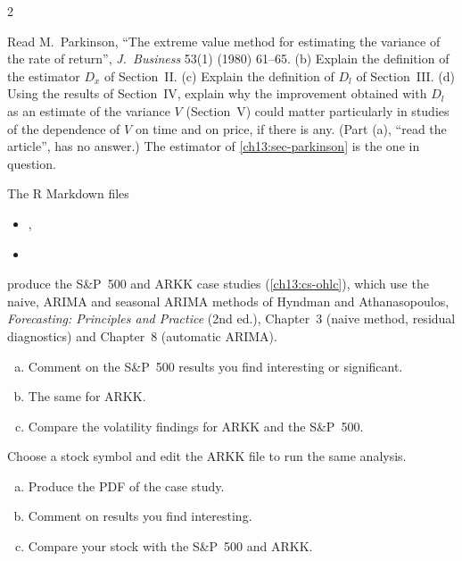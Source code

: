 \begin{paracol}{2}
\begin{exercise}\label{ch13:ex-ps5-p3}
Read M.~Parkinson, ``The extreme value method for estimating the variance of the rate of return'', \emph{J.\ Business} 53(1) (1980) 61--65. (b) Explain the definition of the estimator $D_x$ of Section~II. (c) Explain the definition of $D_l$ of Section~III. (d) Using the results of Section~IV,
explain why the improvement obtained with $D_l$ as an estimate of the variance $V$ (Section~V) could matter particularly in studies of the dependence of $V$ on time and on price, if there is any. (Part (a), ``read the article'', has no answer.) The estimator of \cref{ch13:sec-parkinson} is the one in question.
\end{exercise}

\begin{exercise}\label{ch13:ex-ps5-p4}
The R Markdown files
\begin{itemize}\item {}, \item {}\end{itemize}
produce the S\&P~500 and ARKK case studies (\cref{ch13:cs-ohlc}), which use the naive, ARIMA and seasonal ARIMA methods of Hyndman and Athanasopoulos,
\emph{Forecasting: Principles and Practice} (2nd ed.), Chapter~3 (naive method, residual diagnostics) and Chapter~8 (automatic ARIMA).
\begin{enumerate}[(a)]
  \item Comment on the S\&P~500 results you find interesting or significant.
  \item The same for ARKK.
  \item Compare the volatility findings for ARKK and the S\&P~500.
\end{enumerate}
\end{exercise}

\begin{exercise}\label{ch13:ex-ps5-p5}
Choose a stock symbol and edit the ARKK file to run the same analysis.
\begin{enumerate}[(a)]
  \item Produce the PDF of the case study.
  \item Comment on results you find interesting.
  \item Compare your stock with the S\&P~500 and ARKK.
\end{enumerate}
\end{exercise}


\end{paracol}
